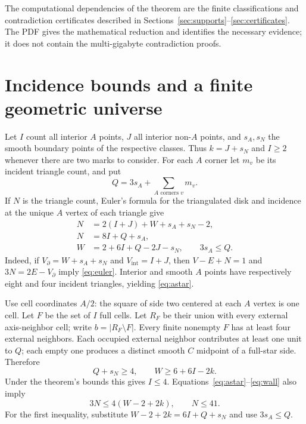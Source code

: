 \documentclass[11pt]{article}
\theoremstyle{definition}
\newcommand{\intr}{\operatorname{int}}
\begin{document}
The computational dependencies of the theorem are the finite classifications and contradiction certificates described in Sections~\ref{sec:supports}--\ref{sec:certificates}. The PDF gives the mathematical reduction and identifies the necessary evidence; it does not contain the multi-gigabyte contradiction proofs.

\section{Incidence bounds and a finite geometric universe}
Let $I$ count all interior $A$ points, $J$ all interior non-$A$ points, and $s_A,s_N$ the smooth boundary points of the respective classes. Thus $k=J+s_N$ and $I\ge2$ whenever there are two marks to consider. For each $A$ corner let $m_v$ be its incident triangle count, and put
\[
 Q=3s_A+\sum_{A\text{ corners }v}m_v.
\]
If $N$ is the triangle count, Euler's formula for the triangulated disk and incidence at the unique $A$ vertex of each triangle give
\begin{align}
 N&=2(I+J)+W+s_A+s_N-2,\label{eq:euler}\\
 N&=8I+Q+s_A,\label{eq:astar}\\
 W&=2+6I+Q-2J-s_N,\qquad 3s_A\le Q.\label{eq:wall}
\end{align}
Indeed, if $V_\partial=W+s_A+s_N$ and $V_{\intr}=I+J$, then $V-E+N=1$ and $3N=2E-V_\partial$ imply \eqref{eq:euler}. Interior and smooth $A$ points have respectively eight and four incident triangles, yielding \eqref{eq:astar}.

Use cell coordinates $A/2$: the square of side two centered at each $A$ vertex is one cell. Let $F$ be the set of $I$ full cells. Let $R_F$ be their union with every external axis-neighbor cell; write $b=|R_F\setminus F|$. Every finite nonempty $F$ has at least four external neighbors. Each occupied external neighbor contributes at least one unit to $Q$; each empty one produces a distinct smooth $C$ midpoint of a full-star side. Therefore
\[
 Q+s_N\ge4,\qquad W\ge6+6I-2k.
\]
Under the theorem's bounds this gives $I\le4$. Equations~\eqref{eq:astar}--\eqref{eq:wall} also imply
\[
 3N\le4(W-2+2k),\qquad N\le41.
\]
For the first inequality, substitute $W-2+2k=6I+Q+s_N$ and use $3s_A\le Q$.
\end{document}
